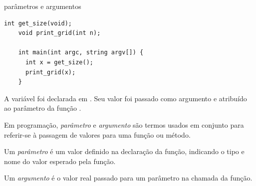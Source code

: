 \documentclass{beamer}
\begin{document}
\begin{frame}{parâmetros e argumentos}

  \begin{lstlisting}[style=normalc,caption=src/mario5.c]
    int get_size(void);
    void print_grid(int n);
    
    int main(int argc, string argv[]) {
      int x = get_size();
      print_grid(x);
    }
  \end{lstlisting}

  A variável  foi declarada em . Seu valor foi
  passado como argumento e atribuído ao parâmetro  da função
  .

  \framebreak

  Em programação, \emph{parâmetro} e \emph{argumento} são termos
  usados em conjunto para referir-se à passagem de valores para uma
  função ou método.

  Um \emph{parâmetro} é um valor definido na declaração da função,
  indicando o tipo e nome do valor esperado pela função.

  Um \emph{argumento} é o valor real passado para um parâmetro na chamada
  da função.
  
\end{frame}
\end{document}
